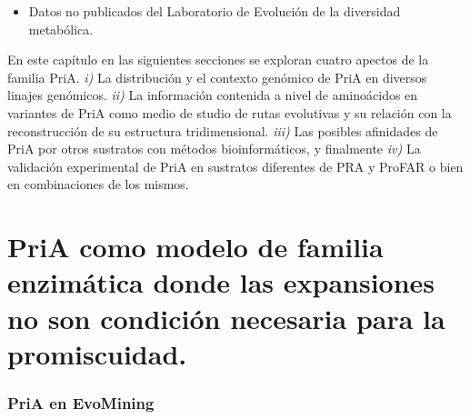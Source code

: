 \documentclass[12pt,twoside]{reedthesis}
\providecommand{\tightlist}{%
  \setlength{\itemsep}{0pt}\setlength{\parskip}{0pt}}
\begin{document}
  \begin{itemize}
  \tightlist
  \item
    Datos no publicados del Laboratorio de Evolución de la diversidad
    metabólica.
  \end{itemize}
  
  En este capítulo en las siguientes secciones se exploran cuatro apectos
  de la familia PriA. \emph{i)} La distribución y el contexto genómico de
  PriA en diversos linajes genómicos. \emph{ii)} La información contenida
  a nivel de aminoácidos en variantes de PriA como medio de studio de
  rutas evolutivas y su relación con la reconstrucción de su estructura
  tridimensional. \emph{iii)} Las posibles afinidades de PriA por otros
  sustratos con métodos bioinformáticos, y finalmente \emph{iv)} La
  validación experimental de PriA en sustratos diferentes de PRA y ProFAR
  o bien en combinaciones de los mismos.
  
  \section{PriA como modelo de familia enzimática donde las expansiones no
  son condición necesaria para la
  promiscuidad.}\label{pria-como-modelo-de-familia-enzimatica-donde-las-expansiones-no-son-condicion-necesaria-para-la-promiscuidad.}
  
  \subsubsection{PriA en EvoMining}\label{pria-en-evomining}
  
\end{document}
